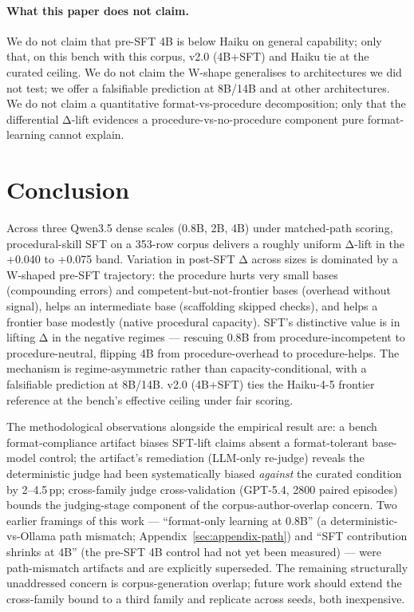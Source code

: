 \documentclass[10pt]{article}
\begin{document}
\paragraph{What this paper does not claim.} We do not claim that pre-SFT 4B is below Haiku on general capability; only that, on this bench with this corpus, v2.0 (4B+SFT) and Haiku tie at the curated ceiling. We do not claim the W-shape generalises to architectures we did not test; we offer a falsifiable prediction at 8B/14B and at other architectures. We do not claim a quantitative format-vs-procedure decomposition; only that the differential Δ-lift evidences a procedure-vs-no-procedure component pure format-learning cannot explain.

\section{Conclusion}

Across three Qwen3.5 dense scales (0.8B, 2B, 4B) under matched-path scoring, procedural-skill SFT on a 353-row corpus delivers a roughly uniform Δ-lift in the +0.040 to +0.075 band. Variation in post-SFT Δ across sizes is dominated by a W-shaped pre-SFT trajectory: the procedure hurts very small bases (compounding errors) and competent-but-not-frontier bases (overhead without signal), helps an intermediate base (scaffolding skipped checks), and helps a frontier base modestly (native procedural capacity). SFT's distinctive value is in lifting Δ in the negative regimes --- rescuing 0.8B from procedure-incompetent to procedure-neutral, flipping 4B from procedure-overhead to procedure-helps. The mechanism is regime-asymmetric rather than capacity-conditional, with a falsifiable prediction at 8B/14B. v2.0 (4B+SFT) ties the Haiku-4-5 frontier reference at the bench's effective ceiling under fair scoring.

The methodological observations alongside the empirical result are: a bench format-compliance artifact biases SFT-lift claims absent a format-tolerant base-model control; the artifact's remediation (LLM-only re-judge) reveals the deterministic judge had been systematically biased \emph{against} the curated condition by 2--4.5\,pp; cross-family judge cross-validation (GPT-5.4, 2800 paired episodes) bounds the judging-stage component of the corpus-author-overlap concern. Two earlier framings of this work --- ``format-only learning at 0.8B'' (a deterministic-vs-Ollama path mismatch; Appendix~\ref{sec:appendix-path}) and ``SFT contribution shrinks at 4B'' (the pre-SFT 4B control had not yet been measured) --- were path-mismatch artifacts and are explicitly superseded. The remaining structurally unaddressed concern is corpus-generation overlap; future work should extend the cross-family bound to a third family and replicate across seeds, both inexpensive.
\end{document}
